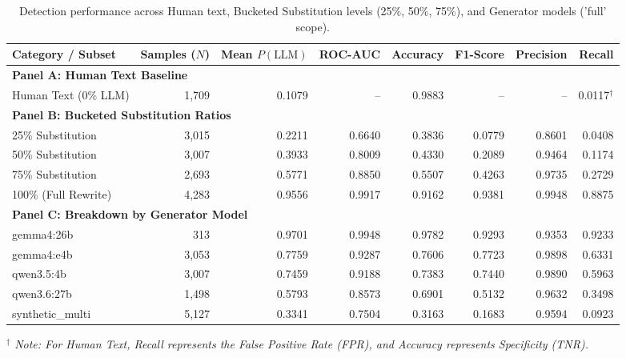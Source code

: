 \begin{table}[htbp]
\centering
\caption{Detection performance across Human text, Bucketed Substitution levels (25\%, 50\%, 75\%), and Generator models ('full' scope).}
\label{tab:bucketed_substitution_performance}
\begin{tabular}{lrrrrrrr}
\toprule
\textbf{Category / Subset} & \textbf{Samples ($N$)} & \textbf{Mean $P(\text{LLM})$} & \textbf{ROC-AUC} & \textbf{Accuracy} & \textbf{F1-Score} & \textbf{Precision} & \textbf{Recall} \\
\midrule
\multicolumn{8}{l}{\textbf{Panel A: Human Text Baseline}} \\
Human Text (0\% LLM) & 1,709 & 0.1079 & -- & 0.9883 & -- & -- & 0.0117$^\dagger$ \\
\midrule
\multicolumn{8}{l}{\textbf{Panel B: Bucketed Substitution Ratios}} \\
25\% Substitution & 3,015 & 0.2211 & 0.6640 & 0.3836 & 0.0779 & 0.8601 & 0.0408 \\
50\% Substitution & 3,007 & 0.3933 & 0.8009 & 0.4330 & 0.2089 & 0.9464 & 0.1174 \\
75\% Substitution & 2,693 & 0.5771 & 0.8850 & 0.5507 & 0.4263 & 0.9735 & 0.2729 \\
100\% (Full Rewrite) & 4,283 & 0.9556 & 0.9917 & 0.9162 & 0.9381 & 0.9948 & 0.8875 \\
\midrule
\multicolumn{8}{l}{\textbf{Panel C: Breakdown by Generator Model}} \\
gemma4:26b & 313 & 0.9701 & 0.9948 & 0.9782 & 0.9293 & 0.9353 & 0.9233 \\
gemma4:e4b & 3,053 & 0.7759 & 0.9287 & 0.7606 & 0.7723 & 0.9898 & 0.6331 \\
qwen3.5:4b & 3,007 & 0.7459 & 0.9188 & 0.7383 & 0.7440 & 0.9890 & 0.5963 \\
qwen3.6:27b & 1,498 & 0.5793 & 0.8573 & 0.6901 & 0.5132 & 0.9632 & 0.3498 \\
synthetic\_multi & 5,127 & 0.3341 & 0.7504 & 0.3163 & 0.1683 & 0.9594 & 0.0923 \\
\bottomrule
\end{tabular}
\vspace{3pt}
\hfill \footnotesize\textit{$^\dagger$ Note: For Human Text, Recall represents the False Positive Rate (FPR), and Accuracy represents Specificity (TNR).}
\end{table}